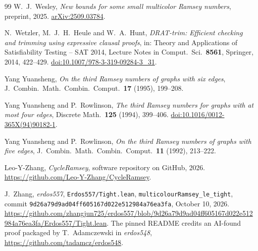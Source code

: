 \begin{thebibliography}{99}
W.~J.~Wesley, \emph{New bounds for some small multicolor Ramsey numbers},
preprint, 2025. \href{https://arxiv.org/abs/2509.03784}{arXiv:2509.03784}.

N.~Wetzler, M.~J.~H.~Heule and W.~A.~Hunt, \emph{DRAT-trim: Efficient
checking and trimming using expressive clausal proofs}, in: Theory and
Applications of Satisfiability Testing -- SAT 2014, Lecture Notes in
Comput.\ Sci.\ \textbf{8561}, Springer, 2014, 422--429.
\href{https://doi.org/10.1007/978-3-319-09284-3_31}{doi:10.1007/978-3-319-09284-3\_31}.

Yang Yuansheng, \emph{On the third Ramsey numbers of graphs with six
edges}, J.~Combin.\ Math.\ Combin.\ Comput.\ \textbf{17} (1995), 199--208.

Yang Yuansheng and P.~Rowlinson, \emph{The third Ramsey numbers for graphs
with at most four edges}, Discrete Math.\ \textbf{125} (1994), 399--406.
\href{https://doi.org/10.1016/0012-365X(94)90182-1}{doi:10.1016/0012-365X(94)90182-1}.

Yang Yuansheng and P.~Rowlinson, \emph{On the third Ramsey numbers of
graphs with five edges}, J.~Combin.\ Math.\ Combin.\ Comput.\ \textbf{11}
(1992), 213--222.

Leo-Y-Zhang, \emph{CycleRamsey}, software repository on GitHub, 2026. \url{https://github.com/Leo-Y-Zhang/CycleRamsey}.

J.~Zhang, \emph{erdos557}, \texttt{Erdos557/Tight.lean},
\texttt{multicolourRamsey\_le\_tight}, commit
\texttt{9d26a79d9ad04ff605167d022e512984a76ea3fa}, October 10, 2026.
\url{https://github.com/zhangjun725/erdos557/blob/9d26a79d9ad04ff605167d022e512984a76ea3fa/Erdos557/Tight.lean}.
The pinned README credits an AI-found proof packaged by T.~Adamczewski
in \emph{erdos548}, \url{https://github.com/tadamcz/erdos548}.

\end{thebibliography}


